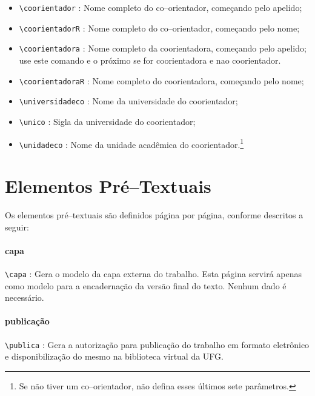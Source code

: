\begin{itemize}

\item \verb|\coorientador| : Nome completo do co--orientador, começando pelo apelido;
\item \verb|\coorientadorR| : Nome completo do co--orientador, começando pelo nome;

\item \verb|\coorientadora| : Nome completo da coorientadora, começando pelo apelido; use este comando e o próximo se for coorientadora e nao coorientador.
\item \verb|\coorientadoraR| : Nome completo do coorientadora, começando pelo nome;

\item \verb|\universidadeco| : Nome da universidade do coorientador;
\item \verb|\unico| : Sigla da universidade do coorientador;
\item \verb|\unidadeco| : Nome da unidade acadêmica do coorientador.\footnote{Se não tiver um co--orientador, não defina esses últimos sete parâmetros.}
\end{itemize}

\section{Elementos Pré--Textuais}
\label{sec:pre}
Os elementos pré--textuais são definidos página por página, conforme descritos a seguir:

\paragraph{capa\\}
\verb|\capa| : Gera o modelo da capa externa do trabalho. Esta página servirá apenas como modelo para a encadernação da versão final do texto. Nenhum dado é necessário.

\paragraph{publicação\\}
\verb|\publica| : Gera a autorização para publicação do trabalho em formato eletrônico e disponibilização do mesmo na biblioteca virtual da UFG.

